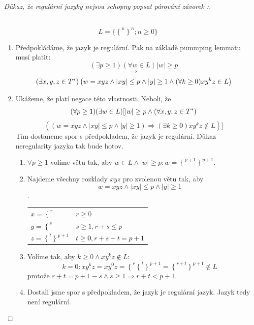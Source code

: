 		\begin{proof}[Důkaz, že regulární jazyky nejsou schopny popsat párování závorek \cite{SestakovaCvicebnice}:]	
			\begin{flushleft}
				$ $\linebreak
				$$L=\Big\{ 
				{\left\{\right.}^n 
				{\left.\right\}}^n;
				n\ge0 
				\Big\}$$
				\begin{enumerate}
					\item Předpokládáme, že jazyk  je regulární. Pak na základě pummping lemmatu \cite{DBLP:journals/corr/PettorossiP17} musí platit:
					$$
					\left( \exists p \ge 1 \right)
					\left( \forall w \in L \right)	
					|w| \ge p $$
					$$\Rightarrow$$ 
					$$
						\left( \exists x,y,z \in {T}^{\ast} \right)
						\left( w = xyz \wedge |xy| \le p \wedge |y| \ge 1 \wedge (\forall k \ge 0)x{y}^{k}z \in L \right)
					$$
					\item
					Ukážeme, že platí negace této vlastnosti. Neboli, že
					$$
					(\forall p \ge 1)
					(\exists w \in L)
					[
						|w| \ge p \wedge 
						(\forall x,y,z \in {T}^{\ast})
						$$
						$$
						(
							(w = xyz \wedge |xy| \le p \wedge |y| \ge 1)
							\Rightarrow
							(\exists k \ge 0)xy^kz \notin L
						)
					]
					$$
					Tím dostaneme spor s předpokladem, že jazyk  je regulární. Důkaz neregularity jazyka  tak bude hotov.
					\begin{enumerate}
						\item 
						$\forall p \ge 1$ volíme větu  tak, aby
						$w \in L \wedge |w| \ge p: w={\left\{\right.}^{p+1} {\left.\right\}}^{p+1}$.
						\item 
						Najdeme všechny rozklady $xyz$ pro zvolenou větu  tak, aby 
						$$w=xyz \wedge |xy| \le p \wedge |y| \ge 1$$.
						\begin{tabular}{l l}
							$x={\left\{\right.}^{r}$ & $r \ge 0$ \\
							$y={\left\{\right.}^{s}$ & $s \ge 1, r+s \le p$ \\
							$z={\left\{\right.}^{t} {\left.\right\}}^{p+1}$ & $t \ge 0, r+s+t=p+1$
						\end{tabular}
						\item 
						Volíme  tak, aby $k \ge 0 \wedge xy^kz \notin L$:
						$$k = 0: xy^kz=xy^0z=
						{\left\{\right.}^{r}{\left\{\right.}^{t} {\left.\right\}}^{p+1}=
						{\left\{\right.}^{r+t} {\left.\right\}}^{p+1}
						\notin L$$
						protože $r+t = p + 1 - s \wedge s \ge 1 \Rightarrow r+t < p + 1$.
						\item 
						Dostali jsme spor s předpokladem, že jazyk  je regulární jazyk. Jazyk  tedy není regulární. 
					\end{enumerate}
				\end{enumerate} 
			\end{flushleft}
		\end{proof}
	
